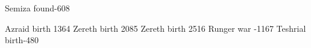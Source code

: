 \begin{comment}
\section{\Resphain}
\end{comment}



\begin{comment}
\subsection{\CiriathSepher}
\end{comment}

\begin{comment}
\subsubsection{\Satharioth}
\end{comment}

\newcommand{\Azraid}       {\Aflatresphan zer\adarkresphan id{}\xspace}
\newcommand{\Azeraid}      {\Azraid}
\newcommand{\Gepheral}     {Gepher\adarkresphan l{}\xspace}
\newcommand{\Gevural}      {Gepher\adarkresphan l{}\xspace}
\newcommand{\Harbeth}      {H\adarkresphan sher\adarkresphan pel\xspace} %
\newcommand{\Morcariel}    {Morc\adarkresphan riel\xspace}
\newcommand{\Mehaloch}     {Men\aflatresphan{}loch\xspace} %
\newcommand{\Shehizol}     {Shehizol{}\xspace}

       {Semiza found}{-608}

\begin{comment}
\subsubsection{\Ketherain}
\end{comment}

\newcommand{\Firaxel}      {F\ilongresphan r\adarkresphan xel\xspace}
\newcommand{\Menessiaraid} {Menessi\adarkresphan r\adarkresphan id\xspace}
\newcommand{\Teshrial}     {Teshri\aflatresphan l\xspace}
\newcommand{\Zeirath}      {\Teshrial}
\newcommand{\Tuerdal}      {Tu\"erd\adarkresphan l{}\xspace} %
\newcommand{\Vesrai}       {Vesr\adarkresphan i{}\xspace} %
\newcommand{\Zereth}       {Zereth{}\xspace} %

       {Azraid birth}  {1364}
       {Zereth birth}  {2085}
      {Zereth birth}  {2516}
     {Runger war}    {-1167}
      {Teshrial birth}{-480}

